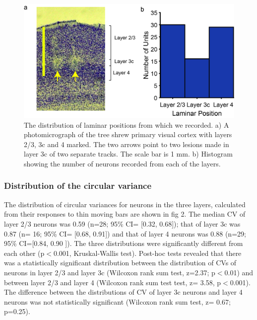 \begin{figure}[H]
	
	\includegraphics[width=\linewidth]{ShrewV1/LaminarPosition.jpg}
	\caption{The distribution of laminar positions from which we recorded. a) A photomicrograph of the tree shrew primary visual cortex with layers 2/3, 3c and 4 marked. The two arrows point to two lesions made in layer 3c of two separate tracks. The scale bar is 1 mm. b) Histogram showing the number of neurons recorded from each of the layers.}
	\label{fig:lp}
\end{figure} 


\subsubsection{Distribution of the circular variance}

The distribution of circular variances for neurons in the three layers,
calculated from their responses to thin moving bars are shown in fig 2.
The median CV of layer 2/3 neurons was 0.59 (n=28; 95\% CI= {[}0.32,
0.68{]}); that of layer 3c was 0.87 (n= 16; 95\% CI= {[}0.68, 0.91{]})
and that of layer 4 neurons was 0.88 (n=29; 95\% CI={[}0.84, 0.90 {]}).
The three distributions were significantly different from each other
(p\(<\)0.001, Kruskal-Wallis test). Post-hoc tests revealed that there
was a statistically significant distribution between the distribution of
CVs of neurons in layer 2/3 and layer 3c (Wilcoxon rank sum test,
z=2.37; p\(<\)0.01) and between layer 2/3 and layer 4 (Wilcoxon rank sum
test test, z= 3.58, p\(<\)0.001). The difference between the
distributions of CV of layer 3c neurons and layer 4 neurons was not
statistically significant (Wilcoxon rank sum test, z= 0.67; p=0.25).

